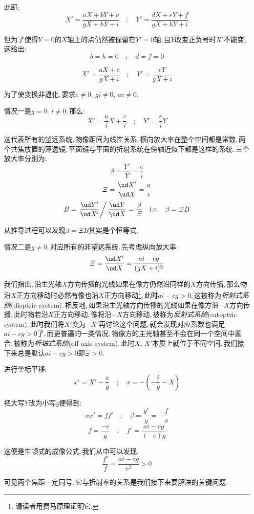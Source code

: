 此即:
\[X'=\frac{aX+bY+c}{gX+hY+i}\quad;\quad Y'=\frac{dX+eY+f}{gX+hY+i}\]

但为了使得\(Y=0\)的\(X\)轴上的点仍然被保留在\(Y'=0\)轴,\,且\(Y\)改变正负号时\(X'\)不能变,\,这给出:
\[b=h=0\quad;\quad d=f=0\]

\[X'=\frac{aX+c}{gX+i}\quad;\quad Y'=\frac{eY}{gX+i}\]

为了使变换非退化,\,要求\(e\neq 0,\,gi\neq 0,\,ac\neq 0\).

情况一是\(g=0,\,i\neq 0\),\,那么:
\[X'=\frac{a}{i}X+\frac{c}{i}\quad ;\quad Y'=\frac{e}{i}Y\]

这代表所有的望远系统,\,物像距间为线性关系,\,横向放大率在整个空间都是常数.\,两个共焦放置的薄透镜,\,平面镜与平面的折射系统在傍轴近似下都是这样的系统.\,三个放大率分别为:
\[\beta=\frac{Y'}{Y}=\frac{e}{i}\]
\[\varXi=\frac{\ud X'}{\ud X}=\frac{a}{i}\]
\[B=\left.\frac{\ud Y'}{\ud X'}\right/ \frac{\ud Y}{\ud X}=\frac{\beta}{\varXi}\quad {\rm i.e.}\quad\beta=\varXi B\]

从推导过程可以发现\(\beta=\varXi B\)其实是个恒等式.

情况二是\(g\neq 0\),\,对应所有的非望远系统.\,先考虑纵向放大率:
\[\varXi=\frac{\ud X'}{\ud X}=\frac{ai-cg}{(gX+i)^2}\]

我们指出,\,沿主光轴\(X\)方向传播的光线如果在像方仍然沿同样的\(X\)方向传播,\,那么物沿\(X\)正方向移动时必然有像也沿\(X\)正方向移动\footnote{请读者用费马原理证明它.},\,此时\(ai-cg>0\),\,这被称为\emph{折射式系统}(dioptric system).\,相反地,\,如果沿主光轴方向传播的光线如果在像方沿\(-X\)方向传播,\,此时物若沿\(X\)正方向移动,\,像将沿\(-X\)方向移动,\,被称为\emph{反射式系统}(catoptric system).\,此时我们将\(X'\)变为\(-X'\)再讨论这个问题,\,就会发现对应系数也满足\(ai-cg>0\)了.\,而更普遍的一类情况,\,物像方的主光轴甚至不会在同一个空间中重合,\,被称为\emph{折轴式系统}(off-axis system).\,此时\(X,\,X'\)本质上就位于不同空间.\,我们接下来总是默认\(ai-cg>0\)即\(\varXi>0\).

进行坐标平移:
\[x'=X'-\frac{a}{g}\quad;\quad x=-(-\frac{i}{g}-X)\]

把大写\(Y\)改为小写\(y\)便得到:
\[xx'=ff'\quad;\quad \beta=\frac{y'}{y}=-\frac{f}{x}\]
\[f=\frac{-e}{g}\quad;\quad f'=\frac{ai-cg}{(-e)g}\]

这便是牛顿式的成像公式.\,我们从中可以发现:
\[\frac{f'}{f}=\frac{ai-cg}{e^2}>0\]

可见两个焦距一定同号.\,它与折射率的关系是我们接下来要解决的关键问题.






